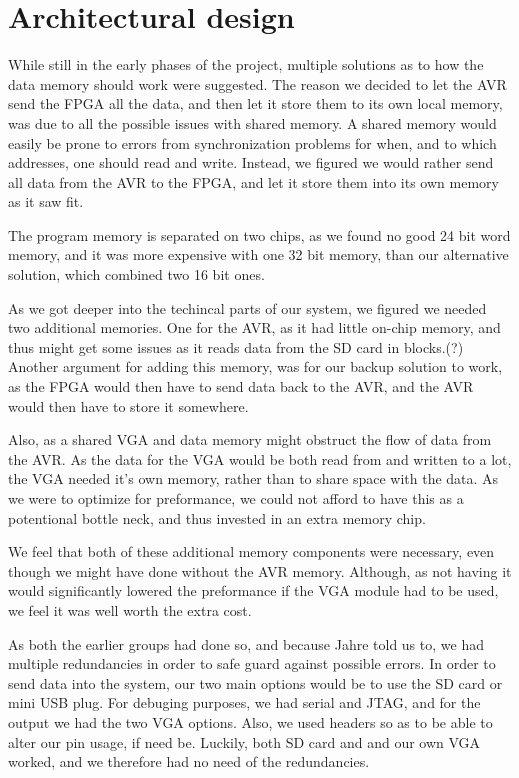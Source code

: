 \section {Architectural design}

While still in the early phases of the project, multiple solutions as to how the data memory should work were suggested. The reason we decided to let the AVR send the FPGA all the data, and then let it store them to its own local memory, was due to all the possible issues with shared memory. A shared memory would easily be prone to errors from synchronization problems for when, and to which addresses, one should read and write. Instead, we figured we would rather send all data from the AVR to the FPGA, and let it store them into its own memory as it saw fit.

The program memory is separated on two chips, as we found no good 24 bit word memory, and it was more expensive with one 32 bit memory, than our alternative solution, which combined two 16 bit ones.

As we got deeper into the techincal parts of our system, we figured we needed two additional memories. One for the AVR, as it had little on-chip memory, and thus might get some issues as it reads data from the SD card in blocks.(?) Another argument for adding this memory, was for our backup solution to work, as the FPGA would then have to send data back to the AVR, and the AVR would then have to store it somewhere.

Also, as a shared VGA and data memory might obstruct the flow of data from the AVR. As the data for the VGA would be both read from and written to a lot, the VGA needed it's own memory, rather than to share space with the data. As we were to optimize for preformance, we could not afford to have this as a potentional bottle neck, and thus invested in an extra memory chip.

We feel that both of these additional memory components were necessary, even though we might have done without the AVR memory. Although, as not having it would significantly lowered the preformance if the VGA module had to be used, we feel it was well worth the extra cost.

As both the earlier groups had done so, and because Jahre told us to, we had multiple redundancies in order to safe guard against possible errors. In order to send data into the system, our two main options would be to use the SD card or mini USB plug. For debuging purposes, we had serial and JTAG, and for the output we had the two VGA options. Also, we used headers so as to be able to alter our pin usage, if need be. Luckily, both SD card and and our own VGA worked, and we therefore had no need of the redundancies.
